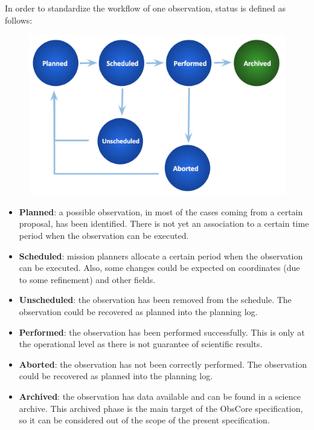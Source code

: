 \documentclass[11pt,a4paper]{ivoa}
\begin{document}
In order to standardize the workflow of one observation, status is defined as
follows:

\begin{figure}[H]
\advance\leftskip 0.0in		\hfill\includegraphics[width=5.0in]
{./media/observations_workflow.png}\hfill\strut%
\end{figure}

\begin{itemize}
	\item{\textbf{Planned}: a possible observation, in most of the cases coming
  from a certain proposal, has been identified. There is not yet an association
  to a certain time period when the observation can be executed.}

	\item{\textbf{Scheduled}: mission planners allocate a certain period when the
	observation can be executed. Also, some changes could be expected on
  coordinates (due to some refinement) and other fields.}

	\item{\textbf{Unscheduled}: the observation has been removed from the schedule.   	     The observation could be recovered as planned into the planning log.}

	\item{\textbf{Performed}: the observation has been performed successfully.
  This is only at the operational level as there is not guarantee of scientific
  results.}

	\item{\textbf{Aborted}: the observation has not been correctly performed. 
	The observation could be recovered as planned into the planning log.}

	\item{\textbf{Archived}: the observation has data available and can be found
  in a science archive. This archived phase is the main target of the ObsCore
  specification, so it can be considered out of the scope of the present
  specification.}

\end{itemize}
\end{document}
